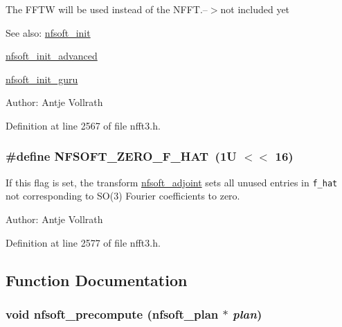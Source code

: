 The FFTW will be used instead of the NFFT.--$>$not included yet

\begin{Desc}
\item[See also:]\hyperlink{group__nfsoft_g31c884458165fa204073c6c16c10775e}{nfsoft\_\-init} 

\hyperlink{group__nfsoft_gf4aec4ee2a2a5d56ca27c4f1a7f90b18}{nfsoft\_\-init\_\-advanced} 

\hyperlink{group__nfsoft_g1c13cdd3f82f48fa41acdd313cdc2052}{nfsoft\_\-init\_\-guru} \end{Desc}
\begin{Desc}
\item[Author:]Antje Vollrath \end{Desc}


Definition at line 2567 of file nfft3.h.\hypertarget{group__nfsoft_gdaa4a4436a6a9e8b491660bb5fc54f8e}{
\subsubsection{\setlength{\rightskip}{0pt plus 5cm}\#define NFSOFT\_\-ZERO\_\-F\_\-HAT~(1U $<$$<$ 16)}}
\label{group__nfsoft_gdaa4a4436a6a9e8b491660bb5fc54f8e}


If this flag is set, the transform \hyperlink{group__nfsoft_g08395b1dd90f9a2565685d17460afc5b}{nfsoft\_\-adjoint} sets all unused entries in {\tt f\_\-hat} not corresponding to SO(3) Fourier coefficients to zero. 

\begin{Desc}
\item[Author:]Antje Vollrath \end{Desc}


Definition at line 2577 of file nfft3.h.

\subsection{Function Documentation}
\hypertarget{group__nfsoft_g123df5d17a0d43fe5e061ac0fb8c1d23}{
\subsubsection{\setlength{\rightskip}{0pt plus 5cm}void nfsoft\_\-precompute ({\bf nfsoft\_\-plan} $\ast$ {\em plan})}}
\label{group__nfsoft_g123df5d17a0d43fe5e061ac0fb8c1d23}


